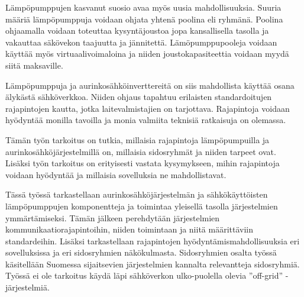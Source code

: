 Lämpöpumppujen kasvanut suosio avaa myös uusia mahdollisuuksia. Suuria määriä lämpöpumppuja voidaan ohjata yhtenä poolina eli ryhmänä. Poolina ohjaamalla voidaan toteuttaa kysyntäjoustoa jopa kansallisella tasolla ja vakauttaa säkövekon taajuutta ja jännitettä. Lämöpumppupooleja voidaan käyttää myös virtuaalivoimaloina ja niiden joustokapasiteettia voidaan myydä siitä maksaville\parencite{ShenJiangLi, fischerTriebelSelinger}.

Lämpöpumppuja ja aurinkosähköinverttereitä on siis mahdollista käyttää osana älykästä sähköverkkoa. Niiden ohjaus tapahtuu erilaisten standardoitujen rajapintojen kautta, jotka laitevalmistajien on tarjottava. Rajapintoja voidaan hyödyntää monilla tavoilla ja monia valmiita teknisiä ratkaisuja on olemassa.

Tämän työn tarkoitus on tutkia, millaisia rajapintoja lämpöpumpuilla ja aurinkosähköjärjestelmillä on, millaisia sidosryhmät ja niiden tarpeet ovat. Lisäksi työn tarkoitus on erityisesti vastata kysymykseen, mihin rajapintoja voidaan hyödyntää ja millaisia sovelluksia ne mahdollistavat.

Tässä työssä tarkastellaan aurinkosähköjärjestelmän ja sähkökäyttöisten lämpöpumppujen komponentteja ja toimintaa yleisellä tasolla järjestelmien ymmärtämiseksi. Tämän jälkeen perehdytään järjestelmien kommunikaatiorajapintoihin, niiden toimintaan ja niitä määrittäviin standardeihin. Lisäksi tarkastellaan rajapintojen hyödyntämismahdollisuuksia eri sovelluksissa ja eri sidosryhmien näkökulmasta. Sidosryhmien osalta työssä käsitellään Suomessa sijaitsevien järjestelmien kannalta relevantteja sidosryhmiä. Työssä ei ole tarkoitus käydä läpi sähköverkon ulko-puolella olevia ”off-grid” -järjestelmiä.
